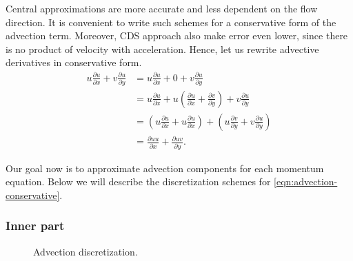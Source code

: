 \documentclass{article}
\numberwithin{equation}{section}
\begin{document}
Central approximations are more accurate and less dependent on the flow direction. 
It is convenient to write such schemes for a conservative form of the advection term. 
Moreover, CDS approach also make error even lower, since there is no product of velocity with acceleration. 
Hence, let us rewrite advective derivatives in conservative form. 
\begin{align}\label{eqn:advection-conservative}
	u\frac{\partial u}{\partial x}+v \frac{\partial u}{\partial y}
	&=u\frac{\partial u}{\partial x}+0+v \frac{\partial u}{\partial y}\nonumber\\
	&= u\frac{\partial u}{\partial x}+ u\left(\frac{\partial u}{\partial x} +\frac{\partial v}{\partial y}\right ) +v \frac{\partial u}{\partial y}\nonumber\\
	&=\left(u\frac{\partial u}{\partial x}+ u\frac{\partial u}{\partial x}\right ) +\left(u\frac{\partial v}{\partial y} +v \frac{\partial u}{\partial y}\right )\nonumber\\
	&=\frac{\partial uu}{\partial x}+ \frac{\partial uv}{\partial y}.
\end{align}
 
Our goal now is to approximate advection components for each momentum equation. Below we will describe the discretization schemes for \cref{eqn:advection-conservative}. 



\subsubsection{Inner part}\label{subsubsec:advection-inner}
\begin{figure}[H] %
  \caption{Advection discretization.}\label{fig:ADV}
\end{figure}
\end{document}
